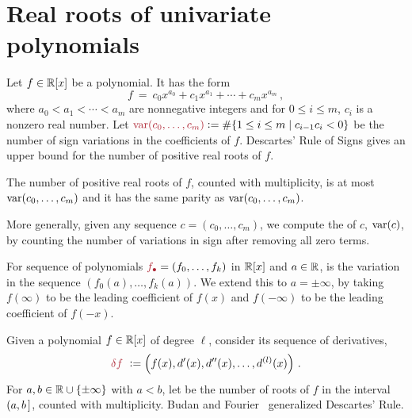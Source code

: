 
\section{Real roots of univariate polynomials}

Let $f\in\mathbb{R}[x]$ be a polynomial.
It has the form
%
 \[
   f\ =\ c_{0}x^{a_{0}} + c_{1}x^{a_{1}} + \cdots + c_{m}x^{a_{m}}\,,
 \]
%
where $a_{0} < a_{1} < \cdots < a_{m}$ are nonnegative integers and for $0\leq i \leq m$, $c_{i}$ is a nonzero real number.
Let $\defcolor{\var(c_0,\dotsc,c_m)}\vcentcolon=\#\{1\leq i\leq m\mid c_{i-1}c_i<0\}$ be the number of sign variations in the coefficients
of $f$.
Descartes' Rule of Signs \cite{So_Book} gives an upper bound for the number of positive real roots of $f$.

\begin{theorem}
  The number of positive real roots of $f$, counted with multiplicity, is at most $\operatorname{{\rm var}}(c_0,\dotsc,c_m)$ and it has the same parity
  as $\operatorname{{\rm var}}(c_0,\dotsc,c_m)$.
\end{theorem}

More generally, given any sequence $c=(c_0,\dotsc,c_m)$, we compute the  of $c$, $\operatorname{{\rm var}}(c)$, by counting the number of
variations in sign after removing all zero terms.
%
\begin{leftbar}

\end{leftbar}
%
For sequence of polynomials  $\defcolor{f_\bullet}=(f_0,\dotsc,f_k)$ in $\mathbb{R}[x]$ and $a\in\mathbb{R}$,  is the
variation in the sequence 
$(f_0(a),\dotsc,f_{k}(a))$. 
We extend this to $a=\pm\infty$, by taking $f(\infty)$ to be the leading coefficient of $f(x)$ and $f(-\infty)$ to be the leading
coefficient of $f(-x)$.

Given a polynomial $f\in\mathbb{R}[x]$ of degree $\ell$, consider its sequence of derivatives,
%
 \[
   \defcolor{\delta f}\ \vcentcolon= \left(f(x),d'(x),d''(x),\dots,d^{(l)}(x)\right)\,.
 \]
%
For $a,b\in \mathbb{R}\cup\{\pm \infty\}$ with $a<b$, let  be the number of roots of $f$ in the interval $(a,b\hspace{.05cm}]$, counted
with multiplicity.
Budan and Fourier~\cite[Ch.\ 2]{So_Book} generalized Descartes' Rule.

